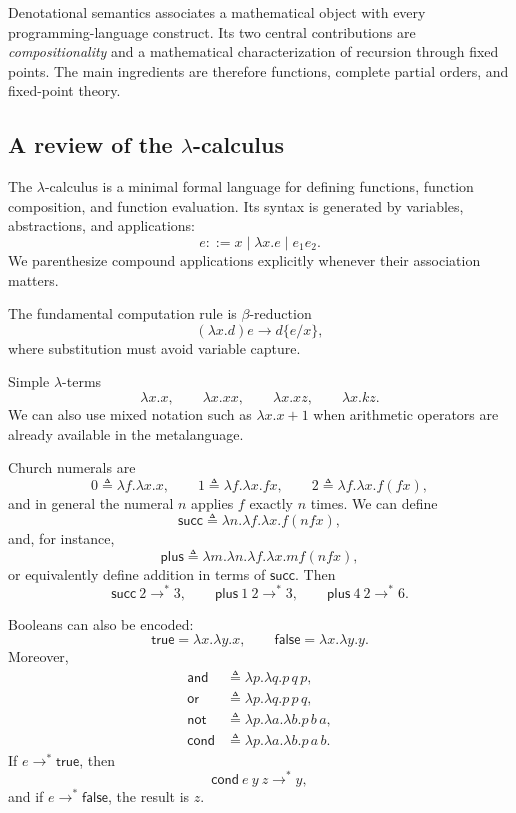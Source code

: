 \documentclass[a4paper]{article}
\begin{document}
Denotational semantics associates a mathematical object with every programming-language construct.
Its two central contributions are \emph{compositionality} and a mathematical characterization of recursion through fixed points.
The main ingredients are therefore functions, complete partial orders, and fixed-point theory.

\subsection{A review of the \(\lambda\)-calculus}

The \(\lambda\)-calculus is a minimal formal language for defining functions, function composition, and function evaluation.
Its syntax is generated by variables, abstractions, and applications:
\[
    e ::= x\mid\lambda x.e\mid e_1e_2.
\]
We parenthesize compound applications explicitly whenever their association matters.

The fundamental computation rule is \(\beta\)-reduction
\[
    (\lambda x.d)e
    \longrightarrow
    d\{e/x\},
\]
where substitution must avoid variable capture.

\begin{snippetexample}{Simple \(\lambda\)-terms}
    \[
        \lambda x.x,
        \qquad
        \lambda x.xx,
        \qquad
        \lambda x.xz,
        \qquad
        \lambda x.kz.
    \]
    We can also use mixed notation such as \(\lambda x.x+1\) when arithmetic operators are already available in the metalanguage.
\end{snippetexample}

Church numerals are
\[
    0\triangleq\lambda f.\lambda x.x,
    \qquad
    1\triangleq\lambda f.\lambda x.fx,
    \qquad
    2\triangleq\lambda f.\lambda x.f(fx),
\]
and in general the numeral \(n\) applies \(f\) exactly \(n\) times.
We can define
\[
    \mathsf{succ}
    \triangleq
    \lambda n.\lambda f.\lambda x.f(nfx),
\]
and, for instance,
\[
    \mathsf{plus}
    \triangleq
    \lambda m.\lambda n.\lambda f.\lambda x.mf(nfx),
\]
or equivalently define addition in terms of \(\mathsf{succ}\).
Then
\[
    \mathsf{succ}\ 2\longrightarrow^*3,
    \qquad
    \mathsf{plus}\ 1\ 2\longrightarrow^*3,
    \qquad
    \mathsf{plus}\ 4\ 2\longrightarrow^*6.
\]

Booleans can also be encoded:
\[
    \mathsf{true}=\lambda x.\lambda y.x,
    \qquad
    \mathsf{false}=\lambda x.\lambda y.y.
\]
Moreover,
\begin{align*}
    \mathsf{and}&\triangleq\lambda p.\lambda q.p\,q\,p,\\
    \mathsf{or}&\triangleq\lambda p.\lambda q.p\,p\,q,\\
    \mathsf{not}&\triangleq\lambda p.\lambda a.\lambda b.p\,b\,a,\\
    \mathsf{cond}&\triangleq\lambda p.\lambda a.\lambda b.p\,a\,b.
\end{align*}
If \(e\longrightarrow^*\mathsf{true}\), then
\[
    \mathsf{cond}\ e\ y\ z\longrightarrow^*y,
\]
and if \(e\longrightarrow^*\mathsf{false}\), the result is \(z\).
\end{document}
